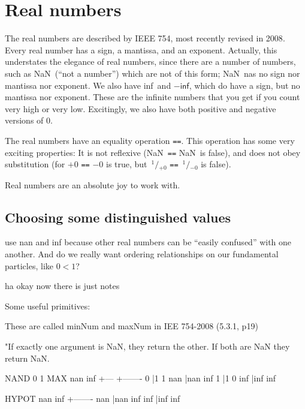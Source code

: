 \documentclass[twocolumn]{article}
\newcommand\sfrac[2]{\!{}\,^{#1}\!/{}\!_{#2}}
\newcommand\nan{\textsf{NaN}}
\renewcommand\inf{\textsf{inf}}
\begin{document}
\section{Real numbers}
The real numbers are described by IEEE 754, most recently revised in
2008\cite{ieee754}. Every real number has a sign, a mantissa, and an
exponent. Actually, this understates the elegance of real numbers,
since there are a number of numbers, such as \nan\ (``not a number'')
which are not of this form; \nan\ nas no sign nor mantissa nor
exponent. We also have \inf\ and $-\inf$, which do have a sign, but no
mantissa nor exponent. These are the infinite numbers that you get if
you count very high or very low. Excitingly, we also have both
positive and negative versions of 0.

The real numbers have an equality operation {\tt ==}. This operation
has some very exciting properties: It is not reflexive (\nan\ {\tt ==}
\nan\ is false), and does not obey substitution (for $+0$ {\tt ==} $-0$
is true, but $\sfrac{1}{+0}$ {\tt ==} $\sfrac{1}{-0}$ is false).

Real numbers are an absolute joy to work with. 


\subsection{Choosing some distinguished values} \label{sec:distinguished}

use nan and inf because other real numbers can be ``easily confused''
with one another. And do we really want ordering relationships on
our fundamental particles, like $0 < 1$?



\nocite{fluint8}

ha okay now there is just notes

Some useful primitives:

        These are called minNum and maxNum in IEE 754-2008 (5.3.1, p19)

        "If exactly one argument is NaN, they return the other.
        If both are NaN they return NaN.

        NAND  0 1     MAX  nan inf
             +---         +-------
           0 |1 1     nan |nan inf
           1 |1 0     inf |inf inf

                    HYPOT  nan inf
                          +-------
                      nan |nan inf
                      inf |inf inf
\end{document}
